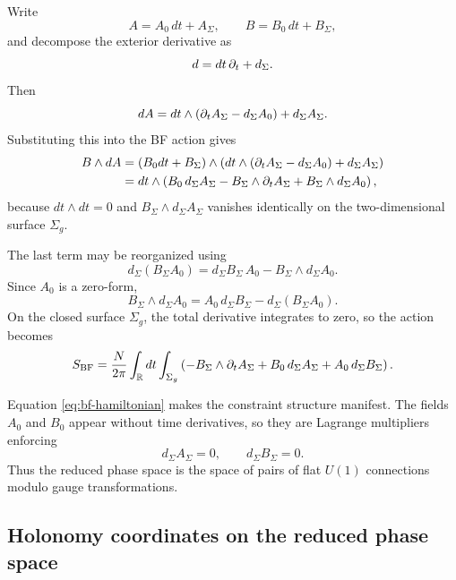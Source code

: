 Write
\begin{equation*}
A=A_0\,dt+A_\Sigma,
\qquad
B=B_0\,dt+B_\Sigma,
\end{equation*}
and decompose the exterior derivative as
\begin{equation*}
d=dt\,\partial_t+d_\Sigma.
\end{equation*}
Then
\begin{equation*}
dA=dt\wedge(\partial_t A_\Sigma-d_\Sigma A_0)+d_\Sigma A_\Sigma.
\end{equation*}
Substituting this into the BF action gives
\begin{align}
B\wedge dA
&=
(B_0dt+B_\Sigma)\wedge\left(dt\wedge(\partial_t A_\Sigma-d_\Sigma A_0)+d_\Sigma A_\Sigma\right) \notag\\
&=
dt\wedge\left(B_0\,d_\Sigma A_\Sigma-B_\Sigma\wedge \partial_t A_\Sigma+B_\Sigma\wedge d_\Sigma A_0\right),
\label{eq:bf-split-first}
\end{align}
because $dt\wedge dt=0$ and $B_\Sigma\wedge d_\Sigma A_\Sigma$ vanishes identically on the two-dimensional surface $\Sigma_g$.

\medskip

\noindent The last term may be reorganized using
\begin{equation*}
d_\Sigma(B_\Sigma A_0)=d_\Sigma B_\Sigma\,A_0-B_\Sigma\wedge d_\Sigma A_0.
\end{equation*}
Since $A_0$ is a zero-form,
\begin{equation*}
B_\Sigma\wedge d_\Sigma A_0=A_0\, d_\Sigma B_\Sigma-d_\Sigma(B_\Sigma A_0).
\end{equation*}
On the closed surface $\Sigma_g$, the total derivative integrates to zero, so the action becomes
\begin{equation}\label{eq:bf-hamiltonian}
S_{\mathrm{BF}}
=
\frac{N}{2\pi}\int_{\mathbb{R}} dt\int_{\Sigma_g}
\left(
-B_\Sigma\wedge \partial_t A_\Sigma
+B_0\,d_\Sigma A_\Sigma
+A_0\,d_\Sigma B_\Sigma
\right).
\end{equation}

\noindent Equation \eqref{eq:bf-hamiltonian} makes the constraint structure manifest. The fields $A_0$ and $B_0$ appear without time derivatives, so they are Lagrange multipliers enforcing
\begin{equation}\label{eq:bf-flat-constraints}
d_\Sigma A_\Sigma=0,
\qquad
d_\Sigma B_\Sigma=0.
\end{equation}
Thus the reduced phase space is the space of pairs of flat $U(1)$ connections modulo gauge transformations.

\subsection{Holonomy coordinates on the reduced phase space}

